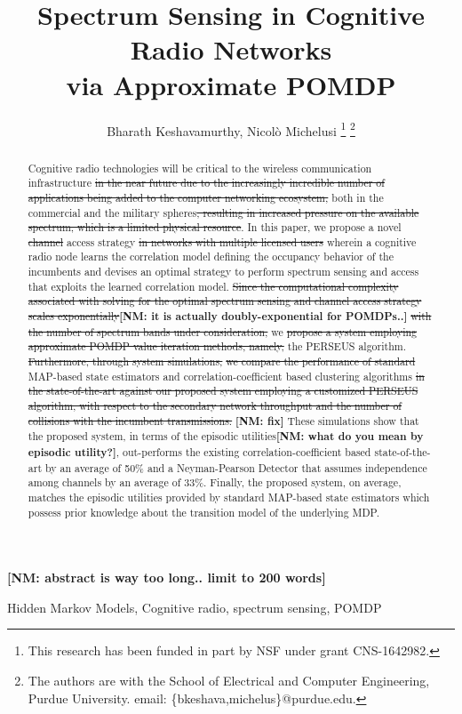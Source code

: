 \documentclass[10pt,twocolumn]{IEEEtran}
\title{Spectrum Sensing in Cognitive Radio Networks
\\
via Approximate POMDP\sst{ methods}}
\author{Bharath Keshavamurthy, Nicol\`{o} Michelusi
\thanks{This research has been funded in part by NSF under grant CNS-1642982.}
\thanks{The authors are with the School of Electrical and Computer Engineering, Purdue University. email: \{bkeshava,michelus\}@purdue.edu.}
\vspace{-5mm}}
\newcommand{\sst}[1]{\st{#1}}
\newcommand{\nm}[1]{{\color{blue}\bf{[NM: #1]}}}
\newcommand{\add}[1]{{\color{red}{#1}}}
\begin{document}
 
\maketitle
{}
\nm{abstract is way too long.. limit to 200 words}
\begin{abstract}
Cognitive radio technologies will be critical to the wireless communication infrastructure
\add{due to their potential to alleviate the spectrum crunch,}\sst{ in the near future due to the increasingly incredible number of applications being added to the computer networking ecosystem,} both in the commercial and the military spheres\sst{, resulting in increased pressure on the available spectrum, which is a limited physical resource}. In this paper, we propose a novel \add{spectrum sensing and}\sst{ channel} access strategy\sst{ in networks with multiple licensed users} \add{based on partially observable Markov decision processes (POMDPs)} wherein a cognitive radio node learns the correlation model defining the occupancy behavior of the incumbents and devises an optimal strategy to perform spectrum sensing and access that exploits the learned correlation model.
\add{To alleviate the complexity of the POMDP optimization,}\sst{ Since the computational complexity associated with solving for the optimal spectrum sensing and channel access strategy scales exponentially}\nm{it is actually doubly-exponential for POMDPs..}\sst{ with the number of spectrum bands under consideration,} we \add{employ}\sst{ propose a system employing approximate POMDP value iteration methods, namely,} the PERSEUS algorithm\add{, an approximate value iteration method}.\sst{ Furthermore, through system simulations,} \add{We compare numerically the performance of the proposed algorithms with state-of-the-art}\sst{we compare the performance of standard} MAP-based state estimators and correlation-coefficient based clustering algorithms\sst{ in the state-of-the-art against our proposed system employing a customized PERSEUS algorithm, with respect to the secondary network throughput and the number of collisions with the incumbent transmissions.} \add{and demonstrate that....}\nm{fix} These simulations show that the proposed system, in terms of the episodic utilities\nm{what do you mean by episodic utility?}, out-performs the existing correlation-coefficient based state-of-the-art by an average of 50\% and a Neyman-Pearson Detector that assumes independence among channels by an average of 33\%. Finally, the proposed system, on average, matches the episodic utilities provided by standard MAP-based state estimators which possess prior knowledge about the transition model of the underlying MDP.
\end{abstract}
\begin{IEEEkeywords}
Hidden Markov Models, Cognitive radio, spectrum sensing, POMDP
\end{IEEEkeywords}
\end{document}
